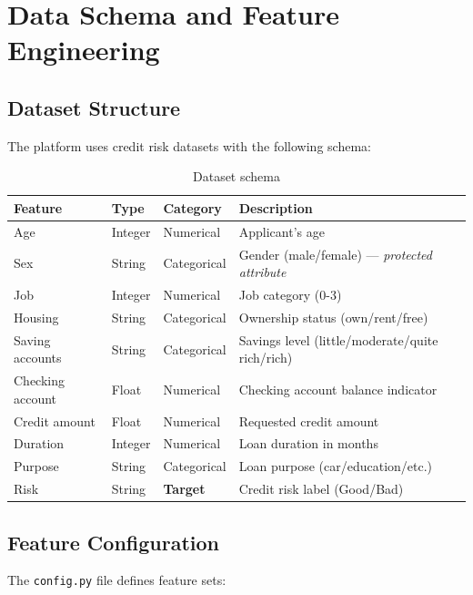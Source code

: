 \documentclass[11pt,a4paper]{article}
\begin{document}
\section{Data Schema and Feature Engineering}

\subsection{Dataset Structure}

The platform uses credit risk datasets with the following schema:

\begin{table}[H]
\centering
\begin{tabular}{@{}llll@{}}
\toprule
\textbf{Feature} & \textbf{Type} & \textbf{Category} & \textbf{Description} \\
\midrule
Age & Integer & Numerical & Applicant's age \\
Sex & String & Categorical & Gender (male/female) — \textit{protected attribute} \\
Job & Integer & Numerical & Job category (0-3) \\
Housing & String & Categorical & Ownership status (own/rent/free) \\
Saving accounts & String & Categorical & Savings level (little/moderate/quite rich/rich) \\
Checking account & Float & Numerical & Checking account balance indicator \\
Credit amount & Float & Numerical & Requested credit amount \\
Duration & Integer & Numerical & Loan duration in months \\
Purpose & String & Categorical & Loan purpose (car/education/etc.) \\
\midrule
Risk & String & \textbf{Target} & Credit risk label (Good/Bad) \\
\bottomrule
\end{tabular}
\caption{Dataset schema}
\end{table}

\subsection{Feature Configuration}

The \texttt{config.py} file defines feature sets:
\end{document}
